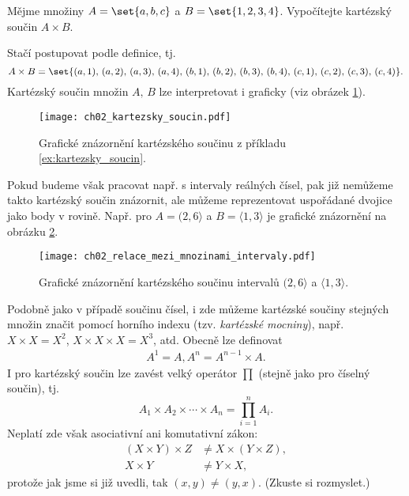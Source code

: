 \begin{example}\label{ex:kartezsky_soucin}
    Mějme množiny $A=\set{a,b,c}$ a $B=\set{1,2,3,4}$. Vypočítejte kartézský součin $A\times B$.
\end{example}
\begin{solution}
    Stačí postupovat podle definice, tj.
    \begin{equation*}
        A\times B=\set{(a,1),\,(a,2),\,(a,3),\,(a,4),\,(b,1),\,(b,2),\,(b,3),\,(b,4),\,(c,1),\,(c,2),\,(c,3),\,(c,4)}.
    \end{equation*}
    Kartézský součin množin $A,\,B$ lze interpretovat i graficky (viz obrázek \ref{fig:kartezsky_soucin}).
\end{solution}
\begin{figure}[h]
    \centering
    \texttt{[image: ch02\_kartezsky\_soucin.pdf]}
    \caption{Grafické znázornění kartézského součinu z příkladu \ref{ex:kartezsky_soucin}.}
    \label{fig:kartezsky_soucin}
\end{figure}
Pokud budeme však pracovat např. s intervaly reálných čísel, pak již nemůžeme takto kartézský součin znázornit, ale můžeme reprezentovat uspořádané dvojice jako body v rovině. Např. pro $A=(2, 6\rangle$ a $B=\langle 1,3 \rangle$ je grafické znázornění na obrázku \ref{fig:kartezsky_soucin_intervaly}.
\begin{figure}[h]
    \centering
    \texttt{[image: ch02\_relace\_mezi\_mnozinami\_intervaly.pdf]}
    \caption{Grafické znázornění kartézského součinu intervalů $(2, 6\rangle$ a $\langle 1,3 \rangle$.}
    \label{fig:kartezsky_soucin_intervaly}
\end{figure}
Podobně jako v případě součinu čísel, i zde můžeme kartézské součiny stejných množin značit pomocí horního indexu (tzv. \emph{kartézské mocniny}), např. $X\times X=X^2$, $X\times X\times X=X^3$, atd. Obecně lze definovat
\begin{align*}
    A^1=A,
    A^n=A^{n-1}\times A.
\end{align*}
I pro kartézský součin lze zavést velký operátor $\prod$ (stejně jako pro číselný součin), tj.
\begin{equation*}
    A_1\times A_2 \times\cdots\times A_n=\prod\limits_{i=1}^{n}{A_i}.
\end{equation*}
Neplatí zde však asociativní ani komutativní zákon:
\begin{align*}
    (X\times Y)\times Z&\neq X\times (Y\times Z),\\
    X\times Y&\neq Y\times X,
\end{align*}
protože jak jsme si již uvedli, tak $(x,y)\neq (y,x)$. (Zkuste si rozmyslet.)
